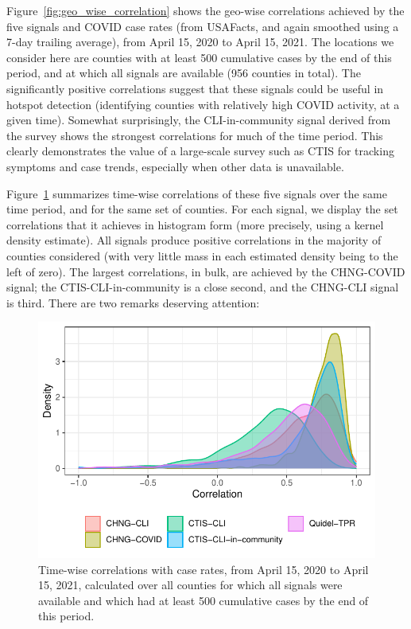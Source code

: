 \documentclass[9pt,twocolumn,twoside,lineno]{pnas-new}
\begin{document}
Figure~\ref{fig:geo_wise_correlation} shows the geo-wise correlations achieved
by the five signals and COVID case rates (from USAFacts, and again smoothed
using a 7-day trailing average), from April 15, 2020 to April 15, 2021. The
locations we consider here are counties with at least 500 cumulative cases by
the end of this period, and at which all signals are available (956 counties in
total). The  significantly positive correlations suggest that these signals
could be useful in hotspot detection  (identifying counties with relatively high
COVID activity, at a given time). Somewhat surprisingly, the CLI-in-community
signal derived from the survey shows the strongest correlations for much of the
time period. This clearly demonstrates the value of a large-scale survey such as
CTIS for tracking symptoms and case trends, especially when other data is
unavailable.

Figure~\ref{fig:time_wise_correlation} summarizes time-wise correlations of
these five signals over the same time period, and for the same set of
counties. For each signal, we display the set correlations that it achieves in
histogram form (more precisely, using a kernel density estimate). All signals
produce positive correlations in the majority of counties considered (with very
little mass in each estimated density being to the left of zero). The largest
correlations, in bulk, are achieved by the CHNG-COVID signal; the
CTIS-CLI-in-community is a close second, and the CHNG-CLI signal is third.
There are two remarks deserving attention:

\begin{figure}[t]
  \includegraphics[width=\columnwidth]{fig/time_wise_correlation.pdf}
  \caption{Time-wise correlations with case rates, from April 15, 2020 to April
    15, 2021, calculated over all counties for which all signals were available
    and which had at least 500 cumulative cases by the end of this period.}
  \label{fig:time_wise_correlation}
 \end{figure}
\end{document}
